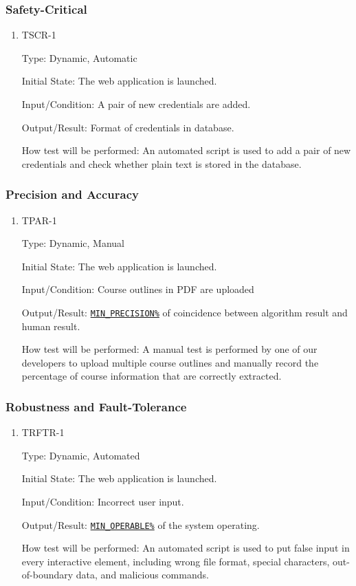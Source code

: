 \documentclass[12pt, titlepage]{article}
\begin{document}
\subsubsection{Safety-Critical}

\begin{enumerate}
\item{TSCR-1\\}\label{TSCR-1}

Type: Dynamic, Automatic
					
Initial State: The web application is launched.
					
Input/Condition: A pair of new credentials are added.
					
Output/Result: Format of credentials in database.
					
How test will be performed: An automated script is used to add a pair of new credentials and check whether plain text is stored in the database.

\end{enumerate}
\subsubsection{Precision and Accuracy}

\begin{enumerate}
\item{TPAR-1\\}\label{TPAR-1}

Type: Dynamic, Manual
					
Initial State: The web application is launched.
					
Input/Condition:  Course outlines in PDF are uploaded
					
Output/Result: \hyperref[MIN_PRECISION]{\texttt{MIN\_PRECISION\%}} of coincidence between algorithm result and human result.
					
How test will be performed: A manual test is performed by one of our developers to upload multiple course outlines and manually record the percentage of course information that are correctly extracted. 

\end{enumerate}

\subsubsection{Robustness and Fault-Tolerance}

\begin{enumerate}
\item{TRFTR-1\\}\label{TRFTR-1}

Type: Dynamic, Automated
					
Initial State: The web application is launched.
					
Input/Condition: Incorrect user input.
					
Output/Result: \hyperref[MIN_OPERABLE]{\texttt{MIN\_OPERABLE\%}} of the system operating.
					
How test will be performed: An automated script is used to put false input in every interactive element, including wrong file format, special characters, out-of-boundary data, and malicious commands.
\end{enumerate}
\end{document}
